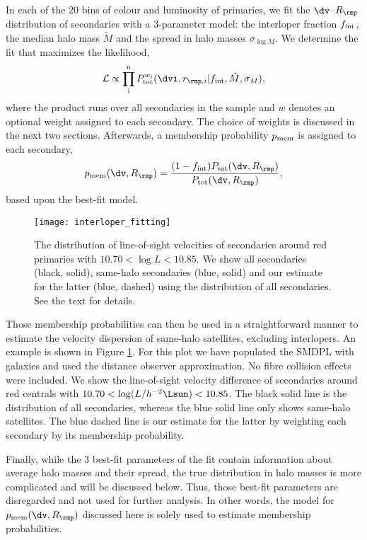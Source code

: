 \documentclass[fleqn,usenatbib,useAMS]{mnras}
\begin{document}
	In each of the $20$ bins of colour and luminosity of primaries, we fit the $\dv$--$R_\rmp$ distribution of secondaries with a $3$-parameter model: the interloper fraction $f_{\rm int}$, the median halo mass $\tilde{M}$ and the spread in halo masses $\sigma_{\log M}$. We determine the fit that maximizes the likelihood,
	\begin{equation}\label{likemodel}
	\mathcal{L} \propto \prod_{\rm i}^{n} P_{\rm tot}^{w_i} (\dvi, r_{\rmp, i} | f_{\rm int}, \tilde{M}, \sigma_M),
	\end{equation}
	where the product runs over all secondaries in the sample and $w$ denotes an optional weight assigned to each secondary. The choice of weights is discussed in the next two sections.  Afterwards, a membership probability $p_{\rm mem}$ is assigned to each secondary,
	\begin{equation}\label{pmem}
	p_{\rm mem} (\dv, R_\rmp) = \frac{(1 - f_{\rm int}) P_{\rm sat} (\dv, R_\rmp)}{P_{\rm tot} (\dv, R_\rmp)},
	\end{equation}
	based upon the best-fit model.
	\begin{figure}
		\centering
		\texttt{[image: interloper\_fitting]}
		\caption{The distribution of line-of-sight velocities of secondaries around red primaries with $10.70 < \log L < 10.85$. We show all secondaries (black, solid), same-halo secondaries (blue, solid) and our estimate for the latter (blue, dashed) using the distribution of all secondaries. See the text for details.  }
		\label{fig:interloper_fitting}
	\end{figure}
	
	Those membership probabilities can then be used in a straightforward manner to estimate the velocity dispersion of same-halo satellites, excluding interlopers. An example is shown in Figure \ref{fig:interloper_fitting}. For this plot we have populated the SMDPL with galaxies and used the distance observer approximation. No fibre collision effects were included. We show the line-of-sight velocity difference of secondaries around red centrals with $10.70 < \log (L/h^{-2}\Lsun) < 10.85$. The black solid line is the distribution of all secondaries, whereas the blue solid line only shows same-halo satellites. The blue dashed line is our estimate for the latter by weighting each secondary by its membership probability.
	
	Finally, while the $3$ best-fit parameters of the fit contain information about average halo masses and their spread, the true distribution in halo masses is more complicated and will be discussed below. Thus, those best-fit parameters are disregarded and not used for further analysis. In other words, the model for $p_{\rm mem} (\dv, R_\rmp)$ discussed here is solely used to estimate membership probabilities.
	
\end{document}
